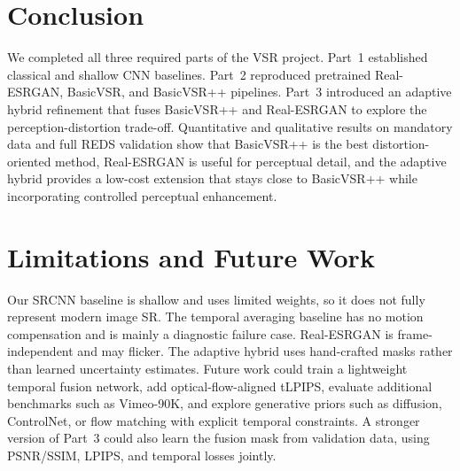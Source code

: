 \section{Conclusion}
We completed all three required parts of the VSR project. Part~1 established classical and shallow CNN baselines. Part~2 reproduced pretrained Real-ESRGAN, BasicVSR, and BasicVSR++ pipelines. Part~3 introduced an adaptive hybrid refinement that fuses BasicVSR++ and Real-ESRGAN to explore the perception-distortion trade-off. Quantitative and qualitative results on mandatory data and full REDS validation show that BasicVSR++ is the best distortion-oriented method, Real-ESRGAN is useful for perceptual detail, and the adaptive hybrid provides a low-cost extension that stays close to BasicVSR++ while incorporating controlled perceptual enhancement.

\section*{Limitations and Future Work}
Our SRCNN baseline is shallow and uses limited weights, so it does not fully represent modern image SR. The temporal averaging baseline has no motion compensation and is mainly a diagnostic failure case. Real-ESRGAN is frame-independent and may flicker. The adaptive hybrid uses hand-crafted masks rather than learned uncertainty estimates. Future work could train a lightweight temporal fusion network, add optical-flow-aligned tLPIPS, evaluate additional benchmarks such as Vimeo-90K, and explore generative priors such as diffusion, ControlNet, or flow matching with explicit temporal constraints. A stronger version of Part~3 could also learn the fusion mask from validation data, using PSNR/SSIM, LPIPS, and temporal losses jointly.
